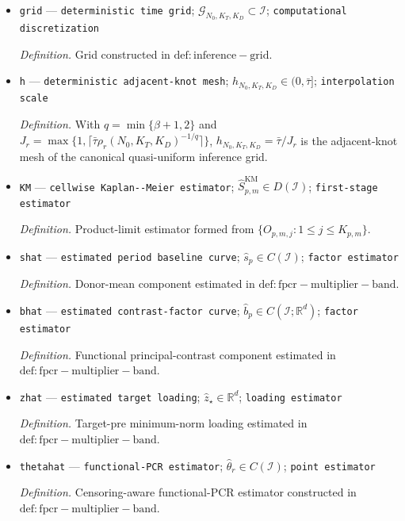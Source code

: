\documentclass{article}
\begin{document}
\begin{itemize}
  \par\smallskip\noindent\emph{Definition.} Remainder process characterized in \(\mathrm{lem:uniform-linearization}\).
  \item \texttt{grid} --- \texttt{deterministic time grid}; \(\mathcal G_{N_0,K_T,K_D}\subset\mathcal I\); \texttt{computational discretization}
  \par\smallskip\noindent\emph{Definition.} Grid constructed in \(\mathrm{def:inference-grid}\).
  \item \texttt{h} --- \texttt{deterministic adjacent-\allowbreak{}knot mesh}; \(h_{N_0,K_T,K_D}\in(0,\bar\tau]\); \texttt{interpolation scale}
  \par\smallskip\noindent\emph{Definition.} With \(q=\min\{\beta+1,2\}\) and \(J_r=\max\{1,\lceil\bar\tau\rho_r(N_0,K_T,K_D)^{-1/q}\rceil\}\), \(h_{N_0,K_T,K_D}=\bar\tau/J_r\) is the adjacent-knot mesh of the canonical quasi-uniform inference grid.
  \item \texttt{KM} --- \texttt{cellwise Kaplan-\allowbreak{}-\allowbreak{}Meier estimator}; \(\widehat S_{p,m}^{\mathrm{KM}}\in D(\mathcal I)\); \texttt{first-\allowbreak{}stage estimator}
  \par\smallskip\noindent\emph{Definition.} Product-limit estimator formed from \(\{O_{p,m,j}:1\le j\le K_{p,m}\}\).
  \item \texttt{shat} --- \texttt{estimated period baseline curve}; \(\widehat s_p\in C(\mathcal I)\); \texttt{factor estimator}
  \par\smallskip\noindent\emph{Definition.} Donor-mean component estimated in \(\mathrm{def:fpcr-multiplier-band}\).
  \item \texttt{bhat} --- \texttt{estimated contrast-\allowbreak{}factor curve}; \(\widehat b_p\in C(\mathcal I;\mathbb R^d)\); \texttt{factor estimator}
  \par\smallskip\noindent\emph{Definition.} Functional principal-contrast component estimated in \(\mathrm{def:fpcr-multiplier-band}\).
  \item \texttt{zhat} --- \texttt{estimated target loading}; \(\widehat z_\star\in\mathbb R^d\); \texttt{loading estimator}
  \par\smallskip\noindent\emph{Definition.} Target-pre minimum-norm loading estimated in \(\mathrm{def:fpcr-multiplier-band}\).
  \item \texttt{thetahat} --- \texttt{functional-\allowbreak{}PCR estimator}; \(\widehat\theta_r\in C(\mathcal I)\); \texttt{point estimator}
  \par\smallskip\noindent\emph{Definition.} Censoring-aware functional-PCR estimator constructed in \(\mathrm{def:fpcr-multiplier-band}\).

\end{itemize}
\end{document}
